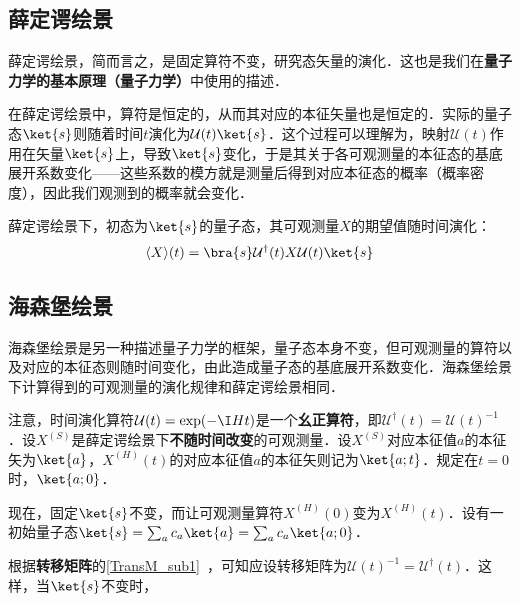 
\subsection{薛定谔绘景}

薛定谔绘景，简而言之，是固定算符不变，研究态矢量的演化．这也是我们在\textbf{量子力学的基本原理（量子力学）}中使用的描述．

在薛定谔绘景中，算符是恒定的，从而其对应的本征矢量也是恒定的．实际的量子态$\ket{s}$则随着时间$t$演化为$\mathcal{U}(t)\ket{s}$．这个过程可以理解为，映射$\mathcal{U}(t)$作用在矢量$\ket{s}$上，导致$\ket{s}$变化，于是其关于各可观测量的本征态的基底展开系数变化——这些系数的模方就是测量后得到对应本征态的概率（概率密度），因此我们观测到的概率就会变化．

薛定谔绘景下，初态为$\ket{s}$的量子态，其可观测量$X$的期望值随时间演化：
\begin{equation}
\langle X \rangle(t) = \bra{s}\mathcal{U}^\dagger(t)X\mathcal{U}(t)\ket{s}
\end{equation}



\subsection{海森堡绘景}

海森堡绘景是另一种描述量子力学的框架，量子态本身不变，但可观测量的算符以及对应的本征态则随时间变化，由此造成量子态的基底展开系数变化．海森堡绘景下计算得到的可观测量的演化规律和薛定谔绘景相同．

注意，时间演化算符$\mathcal{U}(t)=\exp(-\I Ht)$是一个\textbf{幺正算符}，即$\mathcal{U}^\dagger(t)=\mathcal{U}(t)^{-1}$．设$X^{(S)}$是薛定谔绘景下\textbf{不随时间改变}的可观测量．设$X^{(S)}$对应本征值$a$的本征矢为$\ket{a}$，$X^{(H)}(t)$的对应本征值$a$的本征矢则记为$\ket{a; t}$．规定在$t=0$时，$\ket{a; 0}$．

现在，固定$\ket{s}$不变，而让可观测量算符$X^{(H)}(0)$变为$X^{(H)}(t)$．设有一初始量子态$\ket{s}=\sum_a c_a\ket{a}=\sum_a c_a\ket{a; 0}$．

根据\textbf{转移矩阵}的\autoref{TransM_sub1}~，可知应设转移矩阵为$\mathcal{U}(t)^{-1}=\mathcal{U}^\dagger(t)$．这样，当$\ket{s}$不变时，


















